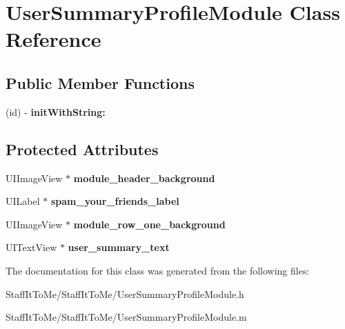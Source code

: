 \hypertarget{interface_user_summary_profile_module}{
\section{\-User\-Summary\-Profile\-Module \-Class \-Reference}
\label{interface_user_summary_profile_module}
}
\subsection*{\-Public \-Member \-Functions}
\begin{DoxyCompactItemize}
\item 
\hypertarget{interface_user_summary_profile_module_a2d656e0d13f736a767a4437feba47429}{
(id) -\/ {\bfseries init\-With\-String\-:}}
\label{interface_user_summary_profile_module_a2d656e0d13f736a767a4437feba47429}

\end{DoxyCompactItemize}
\subsection*{\-Protected \-Attributes}
\begin{DoxyCompactItemize}
\item 
\hypertarget{interface_user_summary_profile_module_a0767cd8881f5ae339c665f44abc27193}{
\-U\-I\-Image\-View $\ast$ {\bfseries module\-\_\-header\-\_\-background}}
\label{interface_user_summary_profile_module_a0767cd8881f5ae339c665f44abc27193}

\item 
\hypertarget{interface_user_summary_profile_module_a3d19d6462c672db44ad6f70a0b3a1115}{
\-U\-I\-Label $\ast$ {\bfseries spam\-\_\-your\-\_\-friends\-\_\-label}}
\label{interface_user_summary_profile_module_a3d19d6462c672db44ad6f70a0b3a1115}

\item 
\hypertarget{interface_user_summary_profile_module_a5ab80b3218940dae713ab0434f320524}{
\-U\-I\-Image\-View $\ast$ {\bfseries module\-\_\-row\-\_\-one\-\_\-background}}
\label{interface_user_summary_profile_module_a5ab80b3218940dae713ab0434f320524}

\item 
\hypertarget{interface_user_summary_profile_module_a738495e82e904e2755eacb33581df294}{
\-U\-I\-Text\-View $\ast$ {\bfseries user\-\_\-summary\-\_\-text}}
\label{interface_user_summary_profile_module_a738495e82e904e2755eacb33581df294}

\end{DoxyCompactItemize}


\-The documentation for this class was generated from the following files\-:\begin{DoxyCompactItemize}
\item 
\-Staff\-It\-To\-Me/\-Staff\-It\-To\-Me/\-User\-Summary\-Profile\-Module.\-h\item 
\-Staff\-It\-To\-Me/\-Staff\-It\-To\-Me/\-User\-Summary\-Profile\-Module.\-m\end{DoxyCompactItemize}
